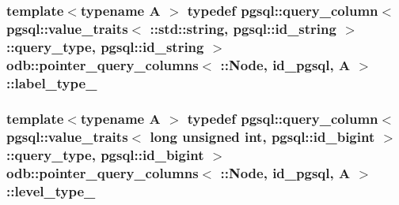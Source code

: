 \subsubsection[{label\+\_\+type\+\_\+}]{\setlength{\rightskip}{0pt plus 5cm}template$<$typename A $>$ typedef pgsql\+::query\+\_\+column$<$ pgsql\+::value\+\_\+traits$<$ \+::std\+::string, pgsql\+::id\+\_\+string $>$\+::query\+\_\+type, pgsql\+::id\+\_\+string $>$ odb\+::pointer\+\_\+query\+\_\+columns$<$ \+::{\bf Node}, id\+\_\+pgsql, A $>$\+::{\bf label\+\_\+type\+\_\+}}\label{structodb_1_1pointer__query__columns_3_01_1_1_node_00_01id__pgsql_00_01_a_01_4_a7657c74a8e1c7e6d81e8663a3106ce72}
\hypertarget{structodb_1_1pointer__query__columns_3_01_1_1_node_00_01id__pgsql_00_01_a_01_4_ae525ac3a798420edbaf6675b9f0fa7c6}{}
\subsubsection[{level\+\_\+type\+\_\+}]{\setlength{\rightskip}{0pt plus 5cm}template$<$typename A $>$ typedef pgsql\+::query\+\_\+column$<$ pgsql\+::value\+\_\+traits$<$ long unsigned int, pgsql\+::id\+\_\+bigint $>$\+::query\+\_\+type, pgsql\+::id\+\_\+bigint $>$ odb\+::pointer\+\_\+query\+\_\+columns$<$ \+::{\bf Node}, id\+\_\+pgsql, A $>$\+::{\bf level\+\_\+type\+\_\+}}\label{structodb_1_1pointer__query__columns_3_01_1_1_node_00_01id__pgsql_00_01_a_01_4_ae525ac3a798420edbaf6675b9f0fa7c6}
\hypertarget{structodb_1_1pointer__query__columns_3_01_1_1_node_00_01id__pgsql_00_01_a_01_4_ab8843582f1d0813730cd9a49ae43a195}{}
